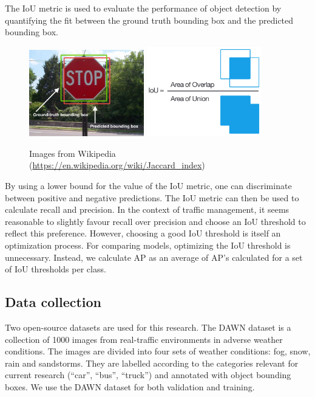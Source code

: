 \documentclass[]{article}
\begin{document}
	The IoU metric is used to evaluate the performance of object detection by quantifying the fit between the ground truth bounding box and the predicted bounding box.
	
	\begin{figure}[h]
		\centering
		\includegraphics[width=5cm]{Intersection_over_Union_-_object_detection_bounding_boxes.jpg}
		\includegraphics[width=5cm]{Intersection_over_Union_-_visual_equation.png}
		\caption{Images from Wikipedia \footnotesize{(\url{https://en.wikipedia.org/wiki/Jaccard_index})}}
	\end{figure}
	
	By using a lower bound for the value of the IoU metric, one can discriminate between positive and negative predictions. The IoU metric can then be used to calculate recall and precision. In the context of traffic management, it seems reasonable to slightly favour recall over precision and choose an IoU threshold to reflect this preference. However, choosing a good IoU threshold is itself an optimization process. For comparing models, optimizing the IoU threshold is unnecessary. Instead, we calculate AP as an average of AP's calculated for a set of IoU thresholds per class.

\subsection{Data collection}

	Two open-source datasets are used for this research. The DAWN dataset \cite{bw1x-yh39-20} is a collection of 1000 images from real-traffic environments in adverse weather conditions. The images are divided into four sets of weather conditions: fog, snow, rain and sandstorms. They are labelled according to the categories relevant for current research (``car'', ``bus'', ``truck'') and annotated with object bounding boxes. We use the DAWN dataset for both validation and training.
	
\end{document}
